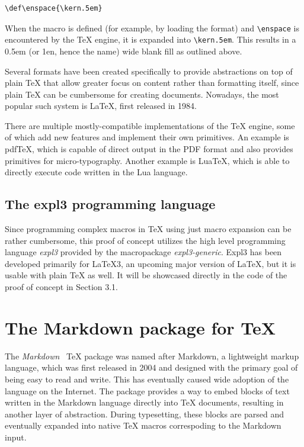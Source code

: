 \documentclass[
  digital,     %
  oneside,     %
  nosansbold,  %
  nocolorbold, %
  lof,         %
  nolot,       %
]{fithesis4}
\newcommand\macro[1]{\texttt{\textbackslash{}{#1}}}
\begin{document}
\noindent
\lstset{language=[plain]TeX}
\begin{lstlisting}
\def\enspace{\kern.5em}
\end{lstlisting}

When the macro is defined (for example, by loading the format) and \macro{enspace} is encountered by the \TeX{} engine, it is expanded into \macro{kern.5em}. This results in a 0.5em (or 1en, hence the name) wide blank fill as outlined above.

Several formats have been created specifically to provide abstractions on top of plain \TeX{} that allow greater focus on content rather than formatting itself, since plain \TeX{} can be cumbersome for creating documents. Nowadays, the most popular such system is \LaTeX{}, first released in 1984.

There are multiple mostly-compatible implementations of the \TeX{} engine, some of which add new features and implement their own primitives. An example is pdf\TeX{}, which is capable of direct output in the PDF format and also provides primitives for micro-typography\cite{thanh01}. Another example is Lua\TeX{}, which is able to directly execute code written in the Lua language.

\subsection{The expl3 programming language}
Since programming complex macros in \TeX{} using just macro expansion can be rather cumbersome, this proof of concept utilizes the high level programming language \emph{expl3} provided by the macropackage \emph{expl3-generic}. Expl3 has been developed primarily for \LaTeX{}3, an upcoming major version of \LaTeX{}, but it is usable with plain \TeX{} as well. It will be showcased directly in the code of the proof of concept in Section 3.1.

\section{The Markdown package for \TeX{}}
The \emph{Markdown}~\cite{cstug-markdown} \TeX{} package was named after Markdown, a lightweight markup language, which was first released in 2004 and designed with the primary goal of being easy to read and write. This has eventually caused wide adoption of the language on the Internet. The package provides a way to embed blocks of text written in the Markdown language directly into \TeX{} documents, resulting in another layer of abstraction. During typesetting, these blocks are parsed and eventually expanded into native \TeX{} macros correspoding to the Markdown input. 
\end{document}
